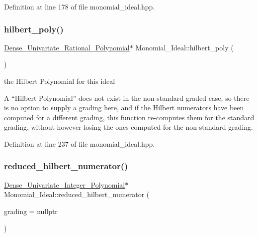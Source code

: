 Definition at line 178 of file monomial\+\_\+ideal.\+hpp.

\mbox{\label{class_monomial___ideal_a2f5e73c22e492ea016a4c7ff117cc7a3}} 
\subsubsection{\texorpdfstring{hilbert\+\_\+poly()}{hilbert\_poly()}}
{\footnotesize\ttfamily \hyperlink{class_dense___univariate___rational___polynomial}{Dense\+\_\+\+Univariate\+\_\+\+Rational\+\_\+\+Polynomial}$\ast$ Monomial\+\_\+\+Ideal\+::hilbert\+\_\+poly (\begin{DoxyParamCaption}{ }\end{DoxyParamCaption})\hspace{0.3cm}{\ttfamily [inline]}}



the Hilbert Polynomial for this ideal 

A ``Hilbert Polynomial'' does not exist in the non-\/standard graded case, so there is no option to supply a grading here, and if the Hilbert numerators have been computed for a different grading, this function re-\/computes them for the standard grading, without however losing the ones computed for the non-\/standard grading. 

Definition at line 237 of file monomial\+\_\+ideal.\+hpp.

\mbox{\label{class_monomial___ideal_a814e71b7c8df465869708bbcdf8f6007}} 
\subsubsection{\texorpdfstring{reduced\+\_\+hilbert\+\_\+numerator()}{reduced\_hilbert\_numerator()}}
{\footnotesize\ttfamily \hyperlink{class_dense___univariate___integer___polynomial}{Dense\+\_\+\+Univariate\+\_\+\+Integer\+\_\+\+Polynomial}$\ast$ Monomial\+\_\+\+Ideal\+::reduced\+\_\+hilbert\+\_\+numerator (\begin{DoxyParamCaption}\item[{const W\+T\+\_\+\+T\+Y\+PE $\ast$}]{grading = {\ttfamily nullptr} }\end{DoxyParamCaption})\hspace{0.3cm}{\ttfamily [inline]}}



